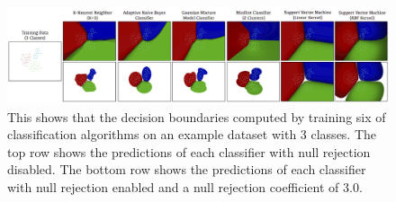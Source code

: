 \begin{figure}
	[h] \centering 
	\includegraphics[width=150mm]{figures/content/grt-null.jpg} \caption{This shows that the decision boundaries computed by training six of classification algorithms on an example dataset with 3 classes. The top row shows the predictions of each classifier with null rejection disabled. The bottom row shows the predictions of each classifier with null rejection enabled and a null rejection coefficient of 3.0. \cite{grt-spec} } \label{fg:grt:null} 
\end{figure}

